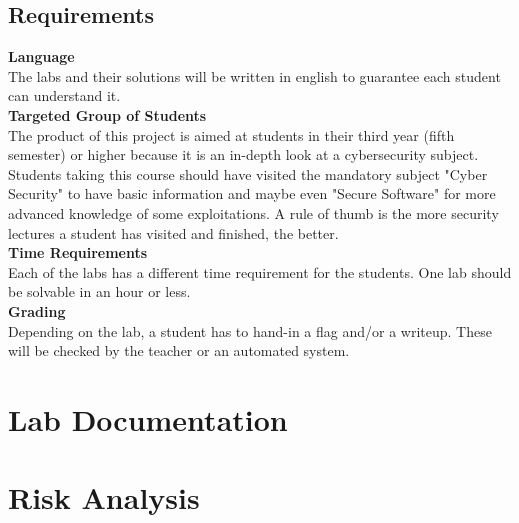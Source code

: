 \subsection{Requirements}
\textbf{Language} \\
The labs and their solutions will be written in english to guarantee each student can understand it. \\[0.5cm]
\textbf{Targeted Group of Students} \\
The product of this project is aimed at students in their third year (fifth semester) or higher because it is an in-depth look at a cybersecurity subject. Students taking this course should have visited the mandatory subject "Cyber Security" to have basic information and maybe even "Secure Software" for more advanced knowledge of some exploitations. A rule of thumb is the more security lectures a student has visited and finished, the better. \\[0.5cm]
\textbf{Time Requirements} \\
Each of the labs has a different time requirement for the students. One lab should be solvable in an hour or less.  \\[0.5cm]
\textbf{Grading} \\
Depending on the lab, a student has to hand-in a flag and/or a writeup. These will be checked by the teacher or an automated system. \\[0.5cm]

\newpage
\section{Lab Documentation}


\section{Risk Analysis}

